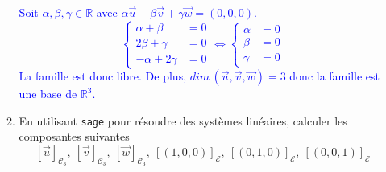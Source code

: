 \documentclass[a4paper,12pt]{article}
\def\R{\mathbb{R}}
\newcommand{\add}[1]{\textcolor{blue}{#1}}
\begin{document}
\begin{exercice}
\begin{enumerate}
\begin{enumerate}
                     \add{
                         Soit $ \alpha,\beta, \gamma \in \R$ avec $\alpha \vec{u}+\beta \vec{v}+\gamma \vec{w}=(0,0,0)$.
                         $$
                         \left\{
                         \begin{aligned}
                             \alpha + \beta &= 0\\
                             2 \beta + \gamma &= 0\\
                             - \alpha + 2 \gamma &= 0
                         \end{aligned}
                         \right.
                         \iff
                         \left\{
                         \begin{aligned}
                             \alpha &= 0\\
                             \beta&= 0\\
                             \gamma &= 0
                         \end{aligned}
                         \right.
                         $$
                     La famille est donc libre. De plus, $dim\, (\vec{u},\vec{v},\vec{w})=3$ donc la famille est une base de $\R^3$.
                     }
                 \item En utilisant {\tt sage} pour résoudre des systèmes linéaires, calculer les composantes suivantes 
                     $$[\vec u]_{\mathcal C_3},\: [\vec v]_{\mathcal C_3},\: [\vec w]_{\mathcal C_3},\:
                     [(1,0,0)]_{\mathcal E},\:[(0,1,0)]_{\mathcal E},\: [(0,0,1)]_{\mathcal E}$$ 


\end{enumerate}
\end{enumerate}
\end{exercice}
\end{document}
